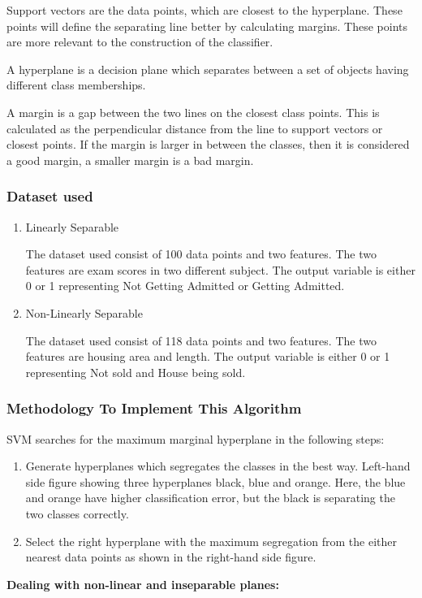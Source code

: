 \documentclass[12pt,a4paper]{article}
\begin{document}
\quad Support vectors are the data points, which are closest to the hyperplane. These points will define the separating line better by calculating margins. These points are more relevant to the construction of the classifier. 

\quad A hyperplane is a decision plane which separates between a set of objects having different class memberships. 

\quad A margin is a gap between the two lines on the closest class points. This is calculated as the perpendicular distance from the line to support vectors or closest points. If the margin is larger in between the classes, then it is considered a good margin, a smaller margin is a bad margin. 


\subsubsection{Dataset used}
\begin{enumerate}
    \item Linearly Separable
    
\quad \quad The dataset used consist of 100 data points and two features. The two features are exam scores in two different subject. The output variable is either 0 or 1 representing Not Getting Admitted or Getting Admitted.
    \item Non-Linearly Separable
    
\quad \quad The dataset used consist of 118 data points and two features. The two features are housing area and length. The output variable is either 0 or 1 representing Not sold and House being sold.

\end{enumerate}
\subsubsection{Methodology To Implement This Algorithm}

\quad \quad SVM searches for the maximum marginal hyperplane in the following steps: 

\begin{enumerate}
    \item Generate hyperplanes which segregates the classes in the best way. Left-hand side figure showing three hyperplanes black, blue and orange. Here, the blue and orange have higher classification error, but the black is separating the two classes correctly.  
    \item Select the right hyperplane with the maximum segregation from the either nearest data points as shown in the right-hand side figure. 
\end{enumerate}
 \textbf{Dealing with non-linear and inseparable planes:}
\end{document}
